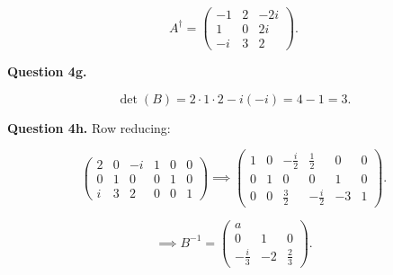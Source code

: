 \documentclass[letterpaper, reqno,11pt]{article}
\begin{document}
\[
    A^\dagger=\begin{pmatrix} -1&2&-2i\\1&0&2i\\-i&3&2 \end{pmatrix} 
.\]

{\noindent\bf Question 4g.} 

\[
\det(B)=2\cdot 1\cdot 2-i(-i)=4-1=3
.\]

{\noindent\bf Question 4h.} Row reducing: 

\[
    \begin{pmatrix} 2&0&-i&1&0&0\\0&1&0&0&1&0\\i&3&2&0&0&1 \end{pmatrix} \implies \begin{pmatrix} 1&0&-\frac{i}{2}&\frac{1}{2}&0&0\\0&1&0&0&1&0\\0&0&\frac{3}{2}&-\frac{i}{2}&-3&1 \end{pmatrix} 
.\]

\[
    \implies B^{-1}=\begin{pmatrix} a\\0&1&0\\-\frac{i}{3}&-2&\frac{2}{3} \end{pmatrix} 
.\]
\end{document}
